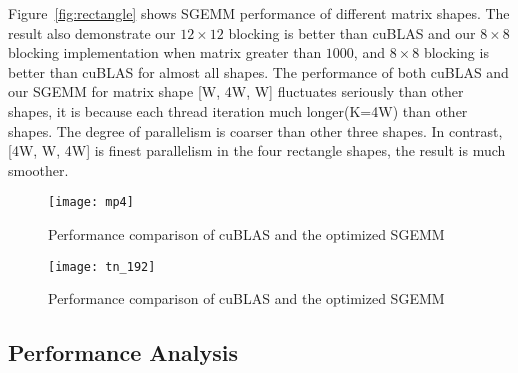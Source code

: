 Figure~\ref{fig:rectangle} shows SGEMM performance of different matrix shapes.
The result also demonstrate our $12\times12$ blocking is better than cuBLAS and
our $8\times8$ blocking implementation when matrix greater than $1000$,  and
$8\times8$ blocking is better than cuBLAS for almost all shapes. The
performance of both cuBLAS and our SGEMM for matrix shape [W, 4W,
W] fluctuates seriously than other shapes, it is because each thread iteration
much longer(K=4W) than other shapes. The degree of parallelism is coarser than other
three shapes. In contrast, [4W, W, 4W] is finest parallelism in the four
rectangle shapes, the result is much smoother.
\begin{figure*}[!t]
\begin{center}
    \texttt{[image: mp4]}
\caption{Performance comparison of cuBLAS and the optimized SGEMM }
\end{center}
        \label{fig:1k2k4k}
\end{figure*}


\begin{figure}[htbp]
\begin{center}
\texttt{[image: tn\_192]}
\caption{Performance comparison of cuBLAS and the optimized SGEMM }
\label{fig:sgemm_tn}
\end{center}
\end{figure}

\subsection{Performance Analysis}

